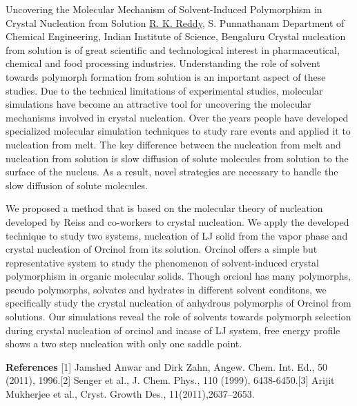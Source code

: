 
    \begin{abstract_online}{Uncovering the Molecular Mechanism of Solvent-Induced Polymorphism in Crystal Nucleation from Solution }{%
        \underline{R. K. Reddy}, S. Punnathanam}{%
        }{%
        Department of Chemical Engineering, Indian Institute of Science, Bengaluru}
    Crystal nucleation from solution is of great scientific and technological interest in pharmaceutical, chemical and food processing industries. Understanding the role of solvent towards polymorph formation from solution is an important aspect of these studies. Due to the technical limitations of experimental studies, molecular simulations have become an attractive tool for uncovering the molecular mechanisms involved in crystal nucleation.  Over the years people have developed specialized molecular simulation techniques to study rare events and applied it to nucleation from melt. The key difference between the nucleation from melt and  nucleation from solution is slow diffusion of solute molecules from solution to the surface of the nucleus. As a result, novel strategies are necessary to handle the slow diffusion of solute molecules. \par We proposed a method that is based on the molecular theory of nucleation developed by Reiss and co-workers to crystal nucleation. We apply the developed technique to study two systems, nucleation of LJ solid from the vapor phase and crystal nucleation of Orcinol from its solution. Orcinol offers a simple  but representative system to study the phenomenon of solvent-induced crystal polymorphism in organic molecular solids. Though orcionl has many polymorphs, pseudo polymorphs, solvates and hydrates in different solvent conditons, we specifically study the crystal nucleation of anhydrous polymorphs of Orcinol from solutions. Our simulations reveal the role of solvents towards polymorph selection during crystal nucleation of orcinol and incase of LJ system, free energy profile shows a two step nucleation with only one saddle point.  
    
        \textbf{References} \newline{}[1] Jamshed Anwar and Dirk Zahn,  Angew. Chem. Int. Ed., 50 (2011), 1996.\newline{}[2] Senger et al., J. Chem. Phys., 110 (1999), 6438-6450.\newline{}[3] Arijit Mukherjee et al., Cryst. Growth Des., 11(2011),2637–2653. 
    \end{abstract_online}
    